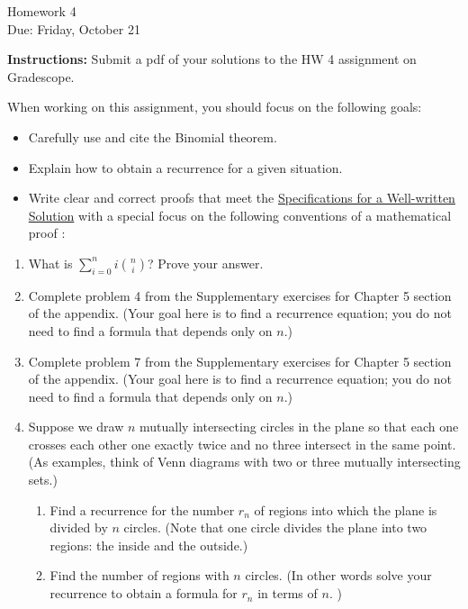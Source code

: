 \documentclass[12pt]{article}
\begin{document}
\begin{center}
{\Large Homework 4}\\
Due: Friday, October 21\\


\end{center}
{\bf Instructions:} Submit a pdf of your solutions to the HW 4 assignment on Gradescope. 

When working on this assignment, you should focus on the following goals:
\begin{itemize}
\item Carefully use and cite the Binomial theorem.
\item Explain how to obtain a recurrence for a given situation. 
\item Write clear and correct proofs that meet the \href{https://docs.google.com/document/d/18LfQoqi6BsY2VdAlpC5xdYEA2rxSGoH0891nVec4_Os/edit?usp=sharing}{Specifications for a Well-written Solution} with a special focus on the following conventions of a mathematical proof :
\end{itemize}

\begin{enumerate}
 \item What is $\sum_{i=0}^n i{n\choose i}$? Prove your answer. 
\item Complete problem 4 from the Supplementary exercises for Chapter 5 section of the appendix.  (Your goal here is to find a recurrence equation; you do not need to find a formula that depends only on $n$.)
\item Complete problem 7 from the Supplementary exercises for Chapter 5 section of the appendix.  (Your goal here is to find a recurrence equation; you do not need to find a formula that depends only on $n$.)
\item  Suppose we draw $n$ mutually intersecting circles in the plane so that each one crosses each other one exactly twice and no three intersect in the same point. (As examples, think of Venn diagrams with two or three mutually intersecting sets.) 
\begin{enumerate}
\item Find a recurrence for the number $r_n$ of regions into which the plane is divided by $n$ circles. (Note that one circle divides the plane into two regions: the inside and the outside.) 
\item Find the number of regions with $n$ circles. (In other words solve your recurrence to obtain a formula for $r_n$ in terms of $n$. )
\end{enumerate}

 

\end{enumerate}
\end{document}
